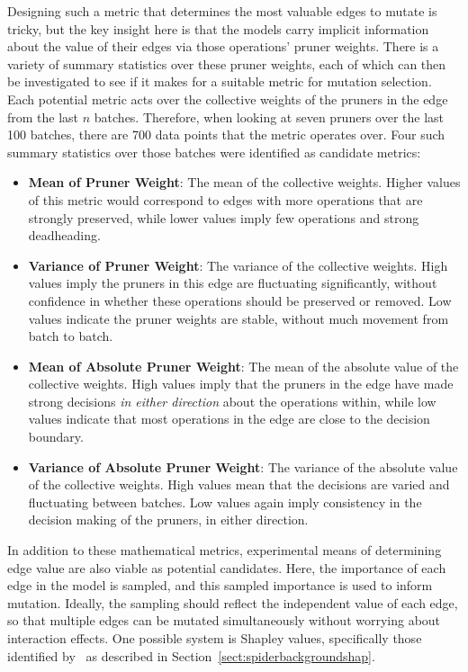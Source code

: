 Designing such a metric that determines the most valuable edges to mutate is tricky, but the key insight here is
that the models carry implicit information about the value of their edges via those operations' pruner weights.
There is a variety of summary statistics over these pruner weights, each of which can then be investigated to see if it makes
for a suitable metric for mutation selection. Each potential metric acts over the collective weights of the pruners in the edge from the last
$n$ batches. Therefore, when looking at seven pruners over the last 100 batches, there are 700 data points that the
metric operates over. Four such summary statistics over those batches were identified as candidate metrics:

\begin{itemize}
    \item \textbf{Mean of Pruner Weight}: The mean of the collective weights.
    Higher values of this metric would correspond to edges with more operations that are strongly preserved, while lower
    values imply few operations and strong deadheading.
    \item \textbf{Variance of Pruner Weight}: The variance of the collective weights. High values imply the pruners in this edge are fluctuating significantly, without confidence in whether these
    operations should be preserved or removed. Low values indicate the pruner weights are stable, without much movement
    from batch to batch.
    \item \textbf{Mean of Absolute Pruner Weight}: The mean of the absolute value of the collective weights. High values
    imply that the pruners in the edge have made strong decisions \textit{in either direction} about the operations within,
    while low values indicate that most operations in the edge are close to the decision boundary.
    \item \textbf{Variance of Absolute Pruner Weight}: The variance of the absolute value of the collective weights. High
    values mean that the decisions are varied and fluctuating between batches. Low values again imply consistency in the
    decision making of the pruners, in either direction.
\end{itemize}

In addition to these mathematical metrics, experimental means of determining edge value are also viable as potential
candidates. Here, the importance of each edge in the model is sampled, and this sampled importance is used to inform
mutation. Ideally, the sampling should reflect the independent value of each edge, so that multiple edges can be mutated
simultaneously without worrying about interaction effects. One possible system is Shapley values, specifically
those identified by~\cite{lundberg2017} as described in Section~\ref{sect:spiderbackgroundshap}.

